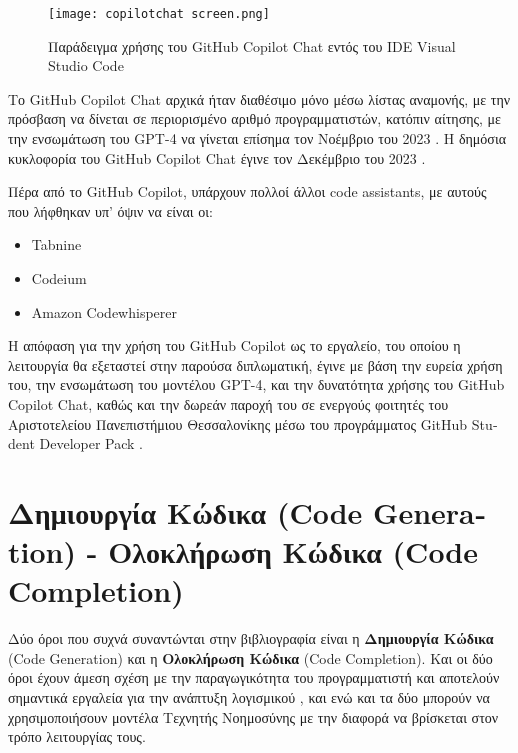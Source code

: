 \begin{figure}[H]
  \begin{center}
    \texttt{[image: copilotchat screen.png]}
    \label{fig:codeComp}
    \caption{Παράδειγμα χρήσης του \textlatin{GitHub Copilot Chat}   εντός του \textlatin{IDE} \textlatin{Visual Studio Code} \cite{vscodeintro, vscode} }
  \end{center}
\end{figure}

Το \textlatin{GitHub Copilot Chat} αρχικά ήταν διαθέσιμο μόνο μέσω λίστας αναμονής, με την πρόσβαση να δίνεται σε περιορισμένο αριθμό προγραμματιστών, κατόπιν αίτησης, με την ενσωμάτωση του \textlatin{GPT-4} να γίνεται επίσημα τον Νοέμβριο του 2023 \cite{github2023gpt4}. Η δημόσια κυκλοφορία του \textlatin{GitHub Copilot Chat} έγινε τον Δεκέμβριο του 2023 \cite{github2023chat}.

Πέρα από το \textlatin{GitHub Copilot}, υπάρχουν πολλοί άλλοι \textlatin{code assistants}, με αυτούς που λήφθηκαν υπ' όψιν να είναι οι: 
\begin{itemize}
    \item \textlatin{Tabnine} \cite{microsoft2021tabnine, vincent2019ai}
    \item \textlatin{Codeium} \cite{forbes2024codeium}
    \item \textlatin{Amazon Codewhisperer} \cite{bays2022AWS}
\end{itemize}
Η απόφαση για την χρήση του \textlatin{GitHub Copilot} ως το εργαλείο, του οποίου η λειτουργία θα εξεταστεί στην παρούσα διπλωματική, έγινε με βάση την ευρεία χρήση του, την ενσωμάτωση του μοντέλου \textlatin{GPT-4}, και την δυνατότητα χρήσης του \textlatin{GitHub Copilot Chat}, καθώς και την δωρεάν παροχή του σε ενεργούς φοιτητές του Αριστοτελείου Πανεπιστήμιου Θεσσαλονίκης μέσω του προγράμματος \textlatin{GitHub Student Developer Pack} \cite{githubstudentpack}.

\section{Δημιουργία Κώδικα \textlatin{(Code Generation)} - Ολοκλήρωση Κώδικα \textlatin{(Code Completion)} }
\label{sec:ch1-}

Δύο όροι που συχνά συναντώνται στην βιβλιογραφία είναι η \textbf{Δημιουργία Κώδικα} \textlatin{(Code Generation)} και η \textbf{Ολοκλήρωση Κώδικα} \textlatin{(Code Completion)}. Και οι δύο όροι έχουν άμεση σχέση με την παραγωγικότητα του προγραμματιστή και αποτελούν σημαντικά εργαλεία για την ανάπτυξη λογισμικού \cite{codecomp, koester1996effect, asaduzzaman2014cscc}, και ενώ και τα δύο μπορούν να χρησιμοποιήσουν μοντέλα Τεχνητής Νοημοσύνης \cite{svyatkovskoy2020fast,raychev2014code} με την διαφορά να βρίσκεται στον τρόπο λειτουργίας τους. 

